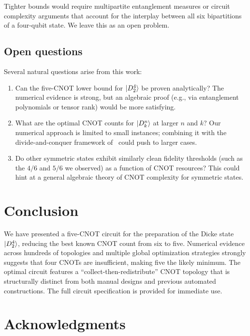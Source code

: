 \documentclass[twocolumn,10pt]{article}
\begin{document}
Tighter bounds would require multipartite entanglement measures or circuit
complexity arguments that account for the interplay between all six
bipartitions of a four-qubit state. We leave this as an open problem.

\subsection{Open questions}

Several natural questions arise from this work:
\begin{enumerate}
    \item Can the five-CNOT lower bound for $\ket{D_2^4}$ be proven
    analytically? The numerical evidence is strong, but an algebraic proof
    (e.g., via entanglement polynomials or tensor rank) would be more
    satisfying.
    \item What are the optimal CNOT counts for $\ket{D_k^n}$ at larger $n$ and
    $k$? Our numerical approach is limited to small instances; combining it with
    the divide-and-conquer framework of~\cite{aktar2022} could push to larger
    cases.
    \item Do other symmetric states exhibit similarly clean fidelity thresholds
    (such as the $4/6$ and $5/6$ we observed) as a function of CNOT resources?
    This could hint at a general algebraic theory of CNOT complexity for
    symmetric states.
\end{enumerate}

\section{Conclusion}
\label{sec:conclusion}

We have presented a five-CNOT circuit for the preparation of the Dicke state
$\ket{D_2^4}$, reducing the best known CNOT count from six to five. Numerical
evidence across hundreds of topologies and multiple global optimization
strategies strongly suggests that four CNOTs are insufficient, making five the
likely minimum. The optimal circuit features a ``collect-then-redistribute''
CNOT topology that is structurally distinct from both manual designs and
previous automated constructions. The full circuit specification is provided for
immediate use.

\section*{Acknowledgments}
\end{document}
